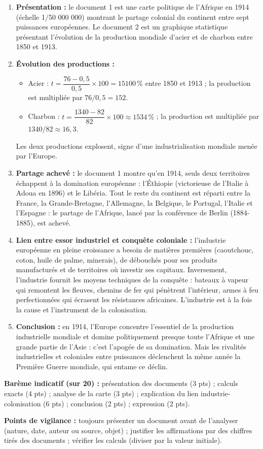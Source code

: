 \documentclass[11pt]{article}
\begin{document}
\begin{corrige}
\begin{enumerate}
\item \textbf{Présentation :} le document 1 est une carte politique de l'Afrique en 1914 (échelle 1/50 000 000) montrant le partage colonial du continent entre sept puissances européennes. Le document 2 est un graphique statistique présentant l'évolution de la production mondiale d'acier et de charbon entre 1850 et 1913.
\item \textbf{Évolution des productions :}
\begin{itemize}
\item Acier : $t = \dfrac{76 - 0,5}{0,5} \times 100 = \num{15100}\,\%$ entre 1850 et 1913 ; la production est multipliée par $76/0,5 = 152$.
\item Charbon : $t = \dfrac{1340 - 82}{82} \times 100 \approx \num{1534}\,\%$ ; la production est multipliée par $1340/82 \approx 16,3$.
\end{itemize}
Les deux productions explosent, signe d'une industrialisation mondiale menée par l'Europe.
\item \textbf{Partage achevé :} le document 1 montre qu'en 1914, seuls deux territoires échappent à la domination européenne : l'Éthiopie (victorieuse de l'Italie à Adoua en 1896) et le Libéria. Tout le reste du continent est réparti entre la France, la Grande-Bretagne, l'Allemagne, la Belgique, le Portugal, l'Italie et l'Espagne : le partage de l'Afrique, lancé par la conférence de Berlin (1884-1885), est achevé.
\item \textbf{Lien entre essor industriel et conquête coloniale :} l'industrie européenne en pleine croissance a besoin de matières premières (caoutchouc, coton, huile de palme, minerais), de débouchés pour ses produits manufacturés et de territoires où investir ses capitaux. Inversement, l'industrie fournit les moyens techniques de la conquête : bateaux à vapeur qui remontent les fleuves, chemins de fer qui pénètrent l'intérieur, armes à feu perfectionnées qui écrasent les résistances africaines. L'industrie est à la fois la cause et l'instrument de la colonisation.
\item \textbf{Conclusion :} en 1914, l'Europe concentre l'essentiel de la production industrielle mondiale et domine politiquement presque toute l'Afrique et une grande partie de l'Asie : c'est l'apogée de sa domination. Mais les rivalités industrielles et coloniales entre puissances déclenchent la même année la Première Guerre mondiale, qui entame ce déclin.
\end{enumerate}
\textbf{Barème indicatif (sur 20) :} présentation des documents (3 pts) ; calculs exacts (4 pts) ; analyse de la carte (3 pts) ; explication du lien industrie-colonisation (6 pts) ; conclusion (2 pts) ; expression (2 pts).
\par\medskip
\textbf{Points de vigilance :} toujours présenter un document avant de l'analyser (nature, date, auteur ou source, objet) ; justifier les affirmations par des chiffres tirés des documents ; vérifier les calculs (diviser par la valeur initiale).
\end{corrige}
\end{document}
